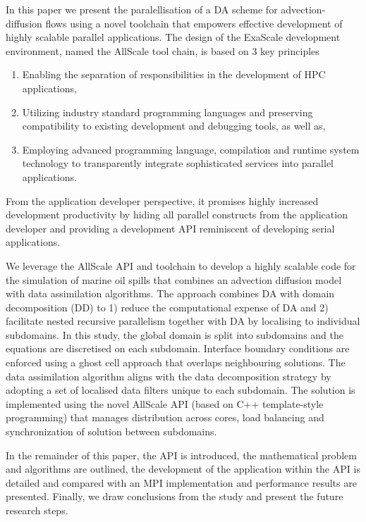 \documentclass[acmsmall,review,anonymous]{acmart}\settopmatter{printfolios=true,printccs=false,printacmref=false}
\begin{document}
In this paper we present the paralellisation of a DA scheme for advection-diffusion flows using a novel toolchain that empowers effective development of highly scalable parallel applications. The design of the ExaScale development environment, named the AllScale tool chain, is based on 3 key principles
\begin{enumerate}
\item Enabling the separation of responsibilities in the development of HPC applications,
\item Utilizing industry standard programming languages and preserving compatibility to existing development and debugging tools, as well as,
\item Employing advanced programming language, compilation and runtime system technology to transparently integrate sophisticated services into parallel applications.
\end{enumerate} 
From the application developer perspective, it promises highly increased development productivity by hiding all parallel constructs from the application developer and providing a development API reminiscent of developing serial applications.

We leverage the AllScale API and toolchain to develop a highly scalable code for the simulation of marine oil spills that combines an advection diffusion model with data assimilation algorithms. The approach combines DA with domain decomposition (DD) to 1) reduce the computational expense of DA and 2) facilitate nested recursive parallelism together with DA by localising to individual subdomains. 
In this study, the global domain is split into subdomains and the equations are discretised on each subdomain. Interface boundary conditions are enforced using a ghost cell approach that overlaps neighbouring solutions. The data assimilation algorithm aligns with the data decomposition strategy by adopting a set of localised data filters unique to each subdomain. The solution is implemented using the novel AllScale API (based on C++ template-style programming) that manages distribution across cores, load balancing and synchronization of solution between subdomains. 

In the remainder of this paper, the API is introduced, the mathematical problem and algorithms are outlined, the development of the application within the API is detailed and compared with an MPI implementation and performance results are presented. Finally, we draw conclusions from the study and present the future research steps.
\end{document}
